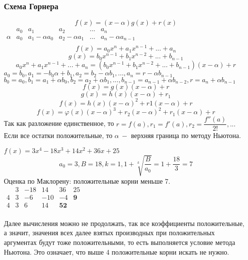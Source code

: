 \documentclass[12pt]{article}
\begin{document}
\subsubsection{Схема Горнера}
$$f(x) = (x - \alpha)g(x) + r(x)$$
$\begin{array}{c|c|c|c|c|c}
        & a_0 & a_1 & a_2 & ... & a_n \\ \hline
      \alpha  & a_0 & a_1 - \alpha a_0  & a_2 - \alpha a_1 & ... & a_n - \alpha a_{n-1} \\ 
\end{array}$
$$f(x) = a_0x^n + a_1x^{n-1} + ... + a_n$$
$$g(x) = b_0x^{n-1} + b_1x^{n-2} + ...  + b_{n-1}$$
$$a_0x^n + a_1x^{n-1} + ... + a_n = (b_0x^{n-1} + b_1x^{n-2} + ...  + b_{n-1})(x - \alpha) + r$$
$a_0 = b_0, a_1 = -b_0\alpha + b_1, a_2 = b_2 - \alpha b_1, ..., a_n = r - \alpha b_{n-1}$ \\
$b_0 = a_0, b_1 = a_1 + \alpha b_0, b_2 = a_2 + \alpha b_1, ..., b_{n-1} = a_{n-1} + \alpha b_{n-2}, r= a_n + \alpha b_{n-1}$
\\
$$f(x) = g(x)(x - \alpha) + r$$
$$g(x) = h(x)(x - \alpha) + r_1$$
$$f(x) = h(x)(x - \alpha)^2 + r1(x-\alpha) + r$$
$$f(x) = \varphi(x)(x-\alpha)^3 + r_2(x-\alpha)^2 + r_1(x-\alpha) + r$$
\indent Так как разложение единственное, то $r = f(a), r_1 = f'(a), r_2 = \dfrac{f''(a)}{2!}, ...$ \\
\indent Если все остатки положительные, то $\alpha~-$ верхняя граница по методу Ньютона.

\begin{examp}
$f(x) = 3x^4  - 18x^3 + 14x^2 + 36x + 25$
$$a_0 = 3, B = 18, k = 1,  1 + \sqrt[k]{\dfrac{B}{a_0}} = 1 + \frac{18}{3} = 7$$
\indent Оценка по Маклорену: положительные корни меньше 7. \\

$\begin{array}{c|c|c|c|c|c}
        & 3 & -18 & 14 & 36 & 25 \\ \hline
      4  & 3 & -6  & -10 & -4 & \textbf{9} \\  \hline
      4 & 3 & 6 & 14 & \textbf{52}
\end{array}$ \\ \\
\indent Далее вычисления можно не продолжать, так все коэффициенты положительные, а значит, значения всех далее взятых производных при положительных аргументах будут тоже положительными, то есть выполняется условие метода Ньютона. Это означает, что выше 4 положительные корни искать не нужно.
\end{examp}
\end{document}
